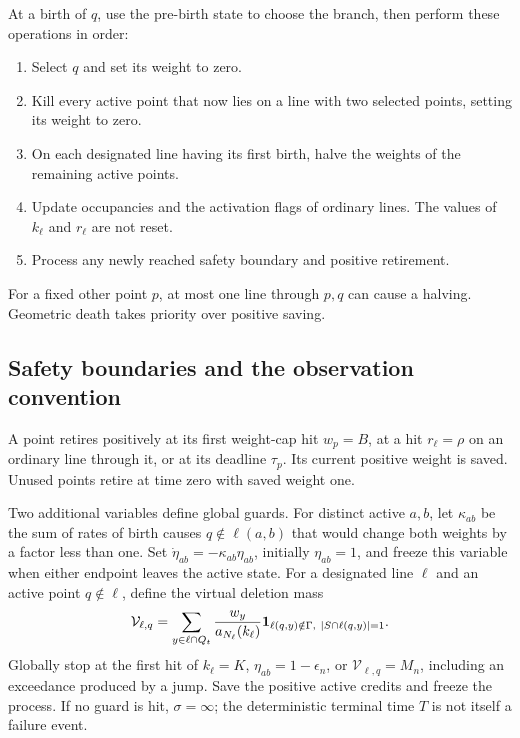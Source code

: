 At a birth of \(q\), use the pre-birth state to choose the branch,
then perform these operations in order:
\begin{enumerate}
\item Select \(q\) and set its weight to zero.
\item Kill every active point that now lies on a line with two selected
points, setting its weight to zero.
\item On each designated line having its first birth, halve the weights
of the remaining active points.
\item Update occupancies and the activation flags of ordinary lines.
The values of \(k_\ell\) and \(r_\ell\) are not reset.
\item Process any newly reached safety boundary and positive retirement.
\end{enumerate}
For a fixed other point \(p\), at most one line through \(p,q\) can
cause a halving. Geometric death takes priority over positive saving.

\subsection{Safety boundaries and the observation convention}
A point retires positively at its first weight-cap hit \(w_p=B\),
at a hit \(r_\ell=\rho\) on an ordinary line through it, or at its
deadline \(\tau_p\). Its current positive weight is saved. Unused
points retire at time zero with saved weight one.

Two additional variables define global guards. For distinct active
\(a,b\), let \(\kappa_{ab}\) be the sum of rates of birth causes
\(q\notin\ell(a,b)\) that would change both weights by a factor less
than one. Set \(\dot\eta_{ab}=-\kappa_{ab}\eta_{ab}\), initially
\(\eta_{ab}=1\), and freeze this variable when either endpoint leaves
the active state. For a designated line \(\ell\) and an active point
\(q\notin\ell\), define the virtual deletion mass
\begin{equation}\label{eq:virtual}
 \mathcal V_{\ell,q}=
 \sum_{y\in\ell\cap Q_t}\frac{w_y}{a_{N_\ell}(k_\ell)}
 \mathbf 1_{\ell(q,y)\notin\Gamma,\ |S\cap\ell(q,y)|=1}.
\end{equation}
Globally stop at the first hit of \(k_\ell=K\),
\(\eta_{ab}=1-\epsilon_n\), or \(\mathcal V_{\ell,q}=M_n\), including
an exceedance produced by a jump. Save the positive active credits
and freeze the process. If no guard is hit, \(\sigma=\infty\);
the deterministic terminal time \(T\) is not itself a failure event.

